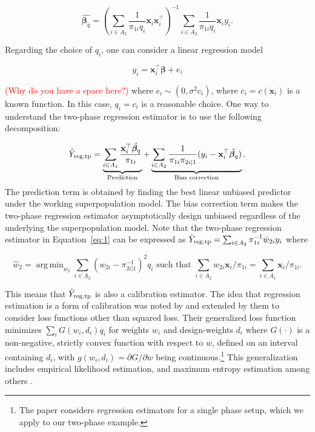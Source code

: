 \documentclass[12pt]{article}
\DeclareMathOperator*{\argmin}{arg\,min}
\newcommand{\bx}{\mathbf{x}}
\renewcommand{\bf}[1]{\mathbf{#1}}
\begin{document}
$$
\hat{\bm \beta_q} = \left(\sum_{i \in A_2} 
 \frac{1}{\pi_{1i} q_i } \bf x_i \bf x_i^\top \right)^{-1} 
\sum_{i \in A_2} \frac{1}{\pi_{1i} q_i} \bf x_i y_i .
$$ 

Regarding the choice of $q_i$, one can consider a linear regression model 

\begin{equation}
y_i = \bx_i^\top \bm \beta + e_i 
\label{regression}
\end{equation}

\textcolor{red}{(Why do you have a space here?) }
where $e_i \sim \left(0, \sigma^2 c_i \right)$, where $c_i=c( \bx_i)$ is a known
function. In this case,  $q_i = c_i$ is a reasonable choice. 
One way to understand the two-phase regression estimator is to use the following
decomposition: 

$$ 
\hat Y_{\rm reg, tp} 
= \underbrace{\sum_{i \in A_1} \frac{\bf x_i^\top \hat{\bm \beta_q}}{\pi_{1i}}}_{
  \text{ Prediction  }} + \underbrace{\sum_{i \in A_2}
\frac{1}{\pi_{1i}\pi_{2i|1}} (y_i - \bf x_i^\top \hat{\bm \beta_q})}_{
\text{Bias correction}}.
$$
The prediction term is obtained by finding the best linear unbiased predictor
under the working superpopulation model. The bias correction term 
makes the two-phase regression estimator asymptotically design unbiased
regardless of the underlying the superpopulation model. 
Note that the two-phase regression estimator in Equation~\ref{eq:1} can be
expressed as  $\hat Y_{\rm reg, tp} =
\sum_{i \in A_2} \pi_{1i}^{-1} \hat w_{2i} y_i$ where 

$$
\hat w_{2} = \argmin_{w_2} \sum_{i \in A_2} (w_{2i} - \pi_{2i|1}^{-1})^2 q_i
\text{ such that } \sum_{i \in A_2} w_{2i} \bf x_i / \pi_{1i} = \sum_{i \in A_1}
\bf x_i / \pi_{1i}.
$$

This means that $\hat Y_{\rm reg, tp}$ is also a calibration estimator. The idea
that regression estimation is a form of calibration was noted by
\cite{deville1992calibration} and extended by them to consider loss functions
other than squared loss. Their generalized loss function minimizes
$\sum_i G(w_i, d_i)q_i$ for weights $w_i$ and design-weights $d_i$ where
$G(\cdot)$ is a non-negative, strictly convex function with respect to $w$,
defined on an interval containing $d_i$, with $g(w_i, d_i) = \partial G /
\partial w$ being continuous.\footnote{The \cite{deville1992calibration} paper
considers regression estimators for a single phase setup, which we apply to our
two-phase example.} This
generalization includes empirical likelihood estimation, and maximum entropy
estimation among others \citep{schennach2007point}. 
\end{document}

